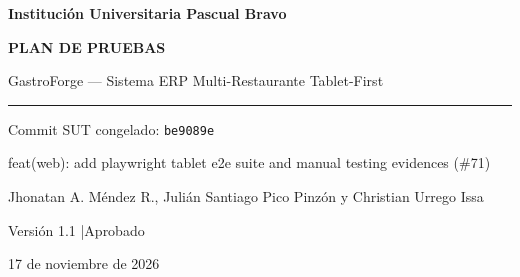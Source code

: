 \documentclass[10pt,a4paper]{article}
\begin{document}
\begin{titlepage}
\thispagestyle{empty}
\centering
\vspace*{1.2cm}
{\large\bfseries Institución Universitaria Pascual Bravo\par}
\vspace{1.2cm}
{\Huge\bfseries\color{gfaccent} PLAN DE PRUEBAS\par}
\vspace{0.6cm}
{\Large GastroForge --- Sistema ERP Multi-Restaurante Tablet-First\par}
\vspace{1.0cm}
\rule{0.6\linewidth}{0.6pt}\par
\vspace{0.8cm}
{\large Commit SUT congelado: \texttt{be9089e}\par}
{\normalsize feat(web): add playwright tablet e2e suite and manual testing evidences (\#71)\par}
\vspace{0.8cm}
{\large Jhonatan A. Méndez R., Julián Santiago Pico Pinzón y Christian Urrego Issa\par}
\vspace{0.6cm}
{\normalsize Versión 1.1 \quad|\quad Aprobado\par}
{\normalsize 17 de noviembre de 2026\par}
\end{titlepage}
\pagestyle{fancy}
{\hypersetup{linkcolor=black}
\renewcommand{\contentsname}{Contenido}
\tableofcontents}
\clearpage

\begingroup\singlespacing\footnotesize\setlength{\parskip}{0pt}
\end{document}

